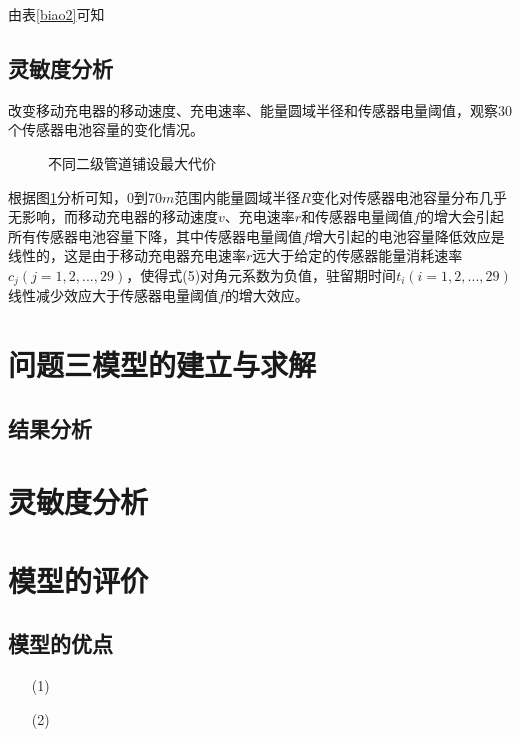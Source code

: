 \documentclass{whutmod}
\begin{document}
		由表\ref{biao2}可知
		
        \subsection{灵敏度分析}

		改变移动充电器的移动速度、充电速率、能量圆域半径和传感器电量阈值，观察$30$个传感器电池容量的变化情况。
		
	\begin{figure}[H]
		\centering
	\end{figure}	
	\begin{figure}[H]
		\centering
		\caption{不同二级管道铺设最大代价}
		\label{mgh}
	\end{figure}
		根据图\ref{mgh}分析可知，$0$到$70m$范围内能量圆域半径$R$变化对传感器电池容量分布几乎无影响，而移动充电器的移动速度$v$、充电速率$r$和传感器电量阈值$f$的增大会引起所有传感器电池容量下降，其中传感器电量阈值$f$增大引起的电池容量降低效应是线性的，这是由于移动充电器充电速率$r$远大于给定的传感器能量消耗速率$c_j(j=1,2,...,29)$，使得式(5)对角元系数为负值，驻留期时间$t_i(i=1,2,...,29)$线性减少效应大于传感器电量阈值$f$的增大效应。
		



    \section{问题三模型的建立与求解}
  		\subsection{结果分析}
  
  	\section{灵敏度分析}
 
  	\section{模型的评价}
		\subsection{模型的优点}
			\begin{itemize}                                             
			\item [(1)]
			\item [(2)] 	
			\end{itemize}
\end{document}
